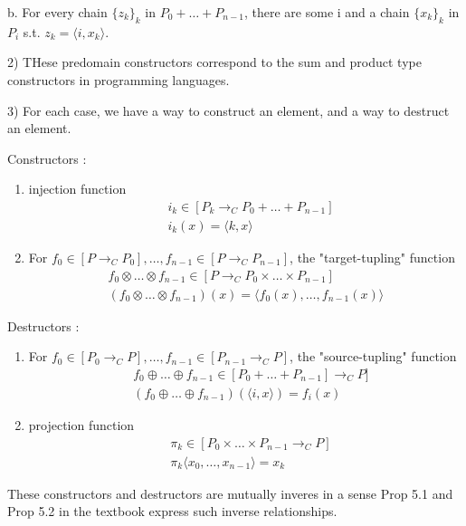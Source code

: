 \documentclass{report}[12pt]
\begin{document}
b. For every chain $\{z_k\}_k$ in $P_0 + \ldots + P_{n-1}$, there are some i and a chain $\{x_k\}_k$ in $P_i$ s.t. $z_k = \langle i, x_k \rangle $.

2) THese predomain constructors correspond to the sum and product type constructors in programming languages.

3) For each case, we have a way to construct an element, and a way to destruct an element.

Constructors :
\begin{enumerate}
  \item injection function
  \begin{align*}
    &i_k \in [P_k \rightarrow_C P_0 + \ldots + P_{n-1}] \\
    &i_k(x) = \langle k, x \rangle
  \end{align*}
  \item For $f_0 \in [P \rightarrow_C P_0], \ldots, f_{n-1} \in [P\rightarrow_C P_{n-1}]$, the "target-tupling" function
  \begin{align*}
    f_0 \otimes \ldots \otimes f_{n-1} \in [P \rightarrow_C P_0 \times \ldots \times P_{n-1}] \\
    (f_0 \otimes \ldots \otimes f_{n-1})(x) = \langle f_0(x), \ldots, f_{n-1}(x) \rangle
  \end{align*}
\end{enumerate}
Destructors :
\begin{enumerate}
  \item For $f_0 \in [P_0 \rightarrow_C P], \ldots, f_{n-1} \in [P_{n-1} \rightarrow_C P]$, the "source-tupling" function
  \begin{align*}
    &f_0 \oplus \ldots \oplus f_{n-1} \in [P_0 + \ldots + P_{n-1}] \rightarrow_C P] \\
    &(f_0 \oplus \ldots \oplus f_{n-1})(\langle i, x \rangle) = f_i (x)
  \end{align*}
  \item projection function
  \begin{align*}
    &\pi_k \in [P_0 \times \ldots \times P_{n-1} \rightarrow_C P] \\
    &\pi_k \langle x_0, \ldots, x_{n-1} \rangle = x_k
  \end{align*}
\end{enumerate}
These constructors and destructors are mutually inveres in a sense Prop 5.1 and Prop 5.2 in the textbook express such inverse relationships.
\end{document}
